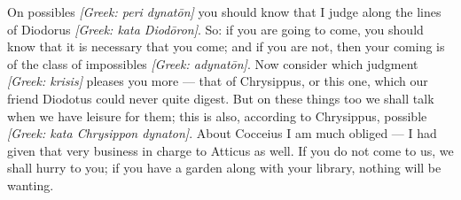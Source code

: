 

 On possibles \textit{[Greek: peri dynatōn]} you should know that I judge along the lines of Diodorus \textit{[Greek: kata Diodōron]}. So: if you are going to come, you should know that it is necessary that you come; and if you are not, then your coming is of the class of impossibles \textit{[Greek: adynatōn]}. Now consider which judgment \textit{[Greek: krisis]} pleases you more --- that of Chrysippus, or this one, which our friend Diodotus could never quite digest. But on these things too we shall talk when we have leisure for them; this is also, according to Chrysippus, possible \textit{[Greek: kata Chrysippon dynaton]}. About Cocceius I am much obliged --- I had given that very business in charge to Atticus as well. If you do not come to us, we shall hurry to you; if you have a garden along with your library, nothing will be wanting.
